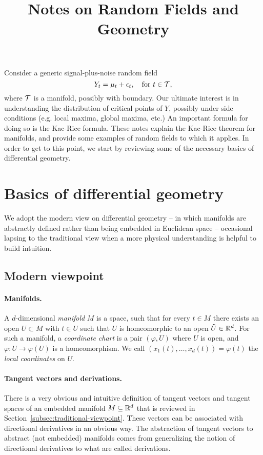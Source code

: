\documentclass{article}
\title{ {\bf Notes on Random Fields and Geometry} }
\begin{document}
	
	\maketitle
	\RaggedRight
	
	Consider a generic signal-plus-noise random field
	\begin{equation}
		\label{eqn:signal-plus-noise}
		Y_t = \mu_t + \epsilon_t, \quad {\rm for} ~ t \in \mathcal{T},
	\end{equation}
	where $\mathcal{T}$ is a manifold, possibly with boundary. Our ultimate interest is in understanding the distribution of critical points of $Y$, possibly under side conditions (e.g. local maxima, global maxima, etc.) An important formula for doing so is the Kac-Rice formula. These notes explain the Kac-Rice theorem for manifolds, and provide some examples of random fields to which it applies. In order to get to this point, we start by reviewing some of the necessary basics of differential geometry.
	
	\section{Basics of differential geometry}
	
	We adopt the modern view on differential geometry -- in which manifolds are abstractly defined rather than being  embedded in Euclidean space -- occasional lapsing to the traditional view when a more physical understanding is helpful to build intuition. 
	
	\subsection{Modern viewpoint}
	  
	\paragraph{Manifolds.}
	A $d$-dimensional \emph{manifold} $M$ is a  space, such that for every $t \in M$ there exists an open $U \subset M$ with $t \in U$ such that $U$ is homeomorphic to an open $\tilde{U} \in \mathbb{R}^d$. For such a manifold, a \emph{coordinate chart} is a pair $(\varphi,U)$ where $U$ is open, and $\varphi: U \to \varphi(U)$ is a homeomorphism. We call $(x_1(t),\ldots,x_d(t)) = \varphi(t)$ the \emph{local coordinates} on $U$.
	
	\paragraph{Tangent vectors and derivations.}
	There is a very obvious and intuitive definition of tangent vectors and tangent spaces of an embedded manifold $M \subseteq \mathbb{R}^d$ that is reviewed in Section~\ref{subsec:traditional-viewpoint}. These vectors can be associated with directional derivatives in an obvious way. The abstraction of tangent vectors to abstract (not embedded) manifolds comes from generalizing the notion of directional derivatives to what are called derivations.
	
\end{document}
